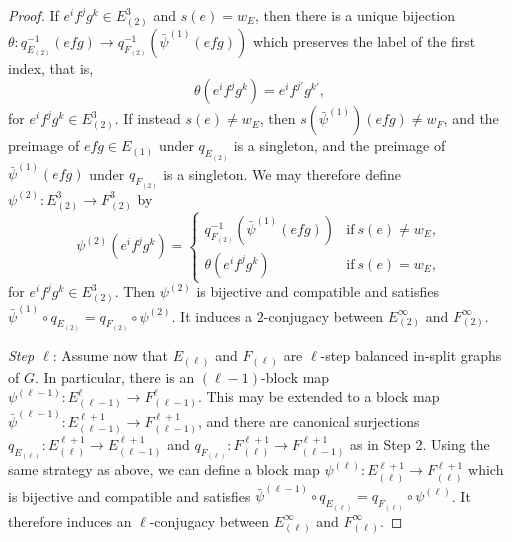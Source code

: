 \documentclass[12pt,a4paper,oneside,reqno,final]{amsart}
\newcommand{\LRA}{\longrightarrow}
\theoremstyle{definition}
\numberwithin{equation}{section} %
\begin{document}
\begin{proof}
    If $e^i f^j g^k\in E_{(2)}^3$ and $s(e) = w_E$, then there is a unique bijection $\theta\colon q_{E_{(2)}}^{-1}(e f g) \LRA q_{F_{(2)}}^{-1}(\bar{\psi}^{(1)}(e f g))$ 
    which preserves the label of the first index, that is,
    \[
        \theta(e^i f^j g^k) = e^i f^{j'} g^{k'},
    \]
    for $e^i f^j g^k\in E_{(2)}^3$.
    If instead $s(e) \neq w_E$, then $s(\bar{\psi}^{(1)})(e f g) \neq w_F$, and the preimage of $e f g\in E_{(1)}$ under $q_{E_{(2)}}$ is a singleton,
    and the preimage of $\bar{\psi}^{(1)}(e f g)$ under $q_{F_{(2)}}$ is a singleton.
    We may therefore define $\psi^{(2)}\colon E_{(2)}^3\LRA F_{(2)}^3$ by
    \[
        \psi^{(2)}(e^i f^j g^k) =
        \begin{cases}
            q_{F_{(2)}}^{-1}(\bar{\psi}^{(1)}(e f g)) & \textrm{if}~s(e) \neq w_E, \\
            \theta(e^i f^j g^k) & \textrm{if}~s(e) = w_E,
        \end{cases}
    \]
    for $e^i f^j g^k\in E_{(2)}^3$.
    Then $\psi^{(2)}$ is bijective and compatible and satisfies $\bar{\psi}^{(1)}\circ q_{E_{(2)}} = q_{F_{(2)}}\circ \psi^{(2)}$.
    It induces a $2$-conjugacy between $E_{(2)}^\infty$ and $F_{(2)}^\infty$.


    \emph{Step $\ell$}:
    Assume now that $E_{(\ell)}$ and $F_{(\ell)}$ are $\ell$-step balanced in-split graphs of $G$.
    In particular, there is an $(\ell - 1)$-block map $\psi^{(\ell - 1)}\colon E_{(\ell - 1)}^\ell \LRA F_{(\ell - 1)}^\ell$.
    This may be extended to a block map $\bar{\psi}^{(\ell - 1)}\colon E_{(\ell - 1)}^{\ell + 1}\LRA F_{(\ell - 1)}^{\ell + 1}$,
    and there are canonical surjections $q_{E_{(\ell)}}\colon E_{(\ell)}^{\ell + 1} \LRA E_{(\ell - 1)}^{\ell + 1}$ 
    and $q_{F_{(\ell)}}\colon F_{(\ell)}^{\ell + 1}\LRA F_{(\ell - 1)}^{\ell + 1}$ as in Step 2.
    Using the same strategy as above, we can define a block map $\psi^{(\ell)}\colon E_{(\ell)}^{\ell + 1}\LRA F_{(\ell)}^{\ell + 1}$
    which is bijective and compatible and satisfies $\bar{\psi}^{(\ell - 1)}\circ q_{E_{(\ell)}} = q_{F_{(\ell)}}\circ \psi^{(\ell)}$.
    It therefore induces an $\ell$-conjugacy between $E_{(\ell)}^\infty$ and $F_{(\ell)}^\infty$.
\end{proof}
\end{document}
